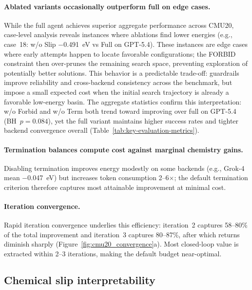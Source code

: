 \paragraph{Ablated variants occasionally outperform full on edge cases.}
While the full agent achieves superior aggregate performance across CMU20, case-level analysis reveals instances where ablations find lower energies (e.g., case~18: w/o Slip $-$0.491~eV vs Full on GPT-5.4).
These instances are edge cases where early attempts happen to locate favorable configurations; the FORBID constraint then over-prunes the remaining search space, preventing exploration of potentially better solutions.
This behavior is a predictable trade-off: guardrails improve reliability and cross-backend consistency across the benchmark, but impose a small expected cost when the initial search trajectory is already a favorable low-energy basin.
The aggregate statistics confirm this interpretation: w/o Forbid and w/o Term both trend toward improving over full on GPT-5.4 (BH~$p = 0.084$), yet the full variant maintains higher success rates and tighter backend convergence overall (Table~\ref{tab:key-evaluation-metrics}).

\paragraph{Termination balances compute cost against marginal chemistry gains.}
Disabling termination improves energy modestly on some backends (e.g., Grok-4 mean $-$0.047~eV) but increases token consumption 2--6$\times$; the default termination criterion therefore captures most attainable improvement at minimal cost.

\paragraph{Iteration convergence.}
Rapid iteration convergence underlies this efficiency: iteration~2 captures 58--80\% of the total improvement and iteration~3 captures 80--87\%, after which returns diminish sharply (Figure~\ref{fig:cmu20_convergence}a). Most closed-loop value is extracted within 2--3 iterations, making the default budget near-optimal.

\subsection{Chemical slip interpretability}

